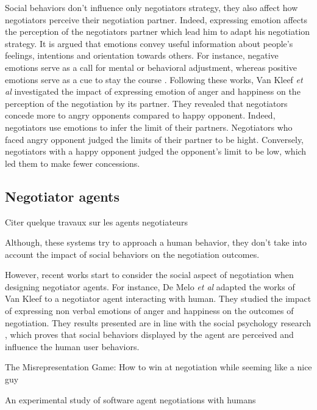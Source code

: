 \documentclass[runningheads,a4paper]{llncs}
\begin{document}
			Social behaviors don't influence only  negotiators strategy, they also affect how negotiators perceive their negotiation partner. Indeed, expressing emotion affects the perception of the negotiators partner which lead him to adapt his negotiation strategy. It is argued that emotions convey useful information about people’s feelings, intentions and orientation towards others. For instance, negative emotions serve as a call for
			mental or behavioral adjustment, whereas positive emotions serve as a cue to stay the course \cite{cacioppo1999emotion}. Following these works, Van Kleef \textit{et al} investigated the impact of expressing emotion of anger and happiness on the perception of the negotiation by its partner\cite{van2006power}. They revealed that negotiators concede more to angry opponents compared to happy opponent. Indeed, negotiators use emotions to infer the limit of their partners. Negotiators who faced angry opponent judged the limits of their partner to be hight. Conversely, negotiators with a happy opponent judged the opponent’s limit to be low, which led them to make fewer concessions.
			
			\subsection{Negotiator agents}
			
			Citer quelque travaux sur les agents negotiateurs 
			
			Although, these systems try to approach a human behavior, they don't take into account the impact of social behaviors on the negotiation outcomes. 
			
			However, recent works start to consider the social aspect of negotiation when designing negotiator agents. For instance, De Melo \textit{et al} \cite{de2011effect} adapted the works of Van Kleef to a negotiator agent interacting with human. They studied the impact of expressing non verbal emotions of anger and happiness on the outcomes of negotiation. They results presented are in line with the social psychology research \cite{van2006power}, which proves that social behaviors displayed by the agent are perceived and influence the human user behaviors. 
		
			The Misrepresentation Game: How to win at negotiation
			while seeming like a nice guy 
		
		An experimental study of software agent negotiations with humans
			
\end{document}

